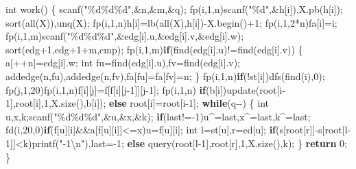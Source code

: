 \documentclass[
]{article}
\newenvironment{Shaded}{}{}
\newcommand{\ControlFlowTok}[1]{\textcolor[rgb]{0.00,0.44,0.13}{\textbf{#1}}}
\newcommand{\DataTypeTok}[1]{\textcolor[rgb]{0.56,0.13,0.00}{#1}}
\newcommand{\DecValTok}[1]{\textcolor[rgb]{0.25,0.63,0.44}{#1}}
\newcommand{\NormalTok}[1]{#1}
\newcommand{\SpecialCharTok}[1]{\textcolor[rgb]{0.25,0.44,0.63}{#1}}
\newcommand{\StringTok}[1]{\textcolor[rgb]{0.25,0.44,0.63}{#1}}
\begin{document}
\begin{Shaded}
\begin{Highlighting}[]
\DataTypeTok{int}\NormalTok{ work()}
\NormalTok{\{}
\NormalTok{    scanf(}\StringTok{"}\SpecialCharTok{\%d\%d\%d}\StringTok{"}\NormalTok{,\&n,\&m,\&q);}
\NormalTok{    fp(i,}\DecValTok{1}\NormalTok{,n)scanf(}\StringTok{"}\SpecialCharTok{\%d}\StringTok{"}\NormalTok{,\&h[i]),X.pb(h[i]); sort(all(X)),unq(X);}
\NormalTok{    fp(i,}\DecValTok{1}\NormalTok{,n)h[i]=lb(all(X),h[i]){-}X.begin()+}\DecValTok{1}\NormalTok{;}
\NormalTok{    fp(i,}\DecValTok{1}\NormalTok{,}\DecValTok{2}\NormalTok{*n)fa[i]=i;}
\NormalTok{    fp(i,}\DecValTok{1}\NormalTok{,m)scanf(}\StringTok{"}\SpecialCharTok{\%d\%d\%d}\StringTok{"}\NormalTok{,\&edg[i].u,\&edg[i].v,\&edg[i].w);}
\NormalTok{    sort(edg+}\DecValTok{1}\NormalTok{,edg+}\DecValTok{1}\NormalTok{+m,cmp);}
\NormalTok{    fp(i,}\DecValTok{1}\NormalTok{,m)}\ControlFlowTok{if}\NormalTok{(find(edg[i].u)!=find(edg[i].v))}
\NormalTok{    \{}
\NormalTok{        a[++n]=edg[i].w; }\DataTypeTok{int}\NormalTok{ fu=find(edg[i].u),fv=find(edg[i].v);}
\NormalTok{        addedge(n,fu),addedge(n,fv),fa[fu]=fa[fv]=n;}
\NormalTok{    \}}
\NormalTok{    fp(i,}\DecValTok{1}\NormalTok{,n)}\ControlFlowTok{if}\NormalTok{(!st[i])dfs(find(i),}\DecValTok{0}\NormalTok{);}
\NormalTok{    fp(j,}\DecValTok{1}\NormalTok{,}\DecValTok{20}\NormalTok{)fp(i,}\DecValTok{1}\NormalTok{,n)f[i][j]=f[f[i][j{-}}\DecValTok{1}\NormalTok{]][j{-}}\DecValTok{1}\NormalTok{];}
\NormalTok{    fp(i,}\DecValTok{1}\NormalTok{,n)}
        \ControlFlowTok{if}\NormalTok{(b[i])update(root[i{-}}\DecValTok{1}\NormalTok{],root[i],}\DecValTok{1}\NormalTok{,X.size(),b[i]);}
        \ControlFlowTok{else}\NormalTok{ root[i]=root[i{-}}\DecValTok{1}\NormalTok{];}
    \ControlFlowTok{while}\NormalTok{(q{-}{-})}
\NormalTok{    \{}
        \DataTypeTok{int}\NormalTok{ u,x,k;scanf(}\StringTok{"}\SpecialCharTok{\%d\%d\%d}\StringTok{"}\NormalTok{,\&u,\&x,\&k);}
        \ControlFlowTok{if}\NormalTok{(last!={-}}\DecValTok{1}\NormalTok{)u\^{}=last,x\^{}=last,k\^{}=last;}
\NormalTok{        fd(i,}\DecValTok{20}\NormalTok{,}\DecValTok{0}\NormalTok{)}\ControlFlowTok{if}\NormalTok{(f[u][i]\&\&a[f[u][i]]\textless{}=x)u=f[u][i];}
        \DataTypeTok{int}\NormalTok{ l=st[u],r=ed[u];}
        \ControlFlowTok{if}\NormalTok{(s[root[r]]{-}s[root[l{-}}\DecValTok{1}\NormalTok{]]\textless{}k)printf(}\StringTok{"{-}1}\SpecialCharTok{\textbackslash{}n}\StringTok{"}\NormalTok{),last={-}}\DecValTok{1}\NormalTok{;}
        \ControlFlowTok{else}\NormalTok{ query(root[l{-}}\DecValTok{1}\NormalTok{],root[r],}\DecValTok{1}\NormalTok{,X.size(),k);}
\NormalTok{    \}}
    \ControlFlowTok{return} \DecValTok{0}\NormalTok{;}
\NormalTok{\}}
\end{Highlighting}
\end{Shaded}
\end{document}

